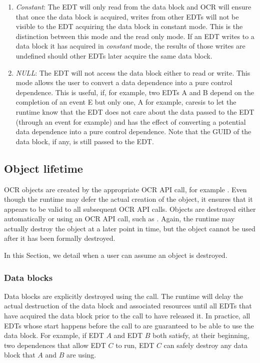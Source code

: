 \begin{enumerate}
\item \emph{Constant}: The EDT will only
  read from the data block and OCR will ensure that once the
  data block is acquired, writes from other EDTs will not be visible to
  the EDT acquiring the data block in constant mode. This is the distinction
  between this mode and the read only mode.
  If an EDT writes to a data block it has acquired in \emph{constant} mode,
  the results of those writes are undefined should other EDTs later
  acquire the same data block.

\item \emph{NULL}: The EDT will not access
  the data block either to read or write. This mode allows the
  user to convert a data dependence into a pure control dependence. This is
  useful, if, for example, two EDTs A and B depend on the completion of an event
  E but only one, A for example, caresis to let the runtime
  know that the EDT does not care about the data passed to the EDT (through
  an event for example) and has the effect of converting a potential data dependence
  into a pure control dependence. Note that the GUID of the data block, if any, is
  still passed to the EDT.
\end{enumerate}
\subsection{Object lifetime}
\label{sec:Lifetime}
OCR objects are created by the appropriate OCR API call, for example
. Even though the runtime may defer the actual
creation of the object, it ensures that it appears to be valid to all
subsequent OCR API calls. Objects are destroyed either automatically or
using an OCR API call, such as . Again, the runtime
may actually destroy the object at a later point in time, but the object
cannot be used after it has been formally destroyed.

In this Section, we detail when a user can assume an object is destroyed.
\subsubsection{Data blocks}
Data blocks are explicitly destroyed using the  call. The
runtime will delay the actual destruction of the data block and associated
resources until all EDTs that have acquired the data block prior to the
call to  have released it. In practice, all EDTs whose
start happens before the call to  are guaranteed to be
able to use the data block. For example, if EDT $A$ and EDT $B$ both satisfy,
at their beginning, two dependences that allow EDT $C$ to run, EDT $C$ can
safely destroy any data block that $A$ and $B$ are using.
